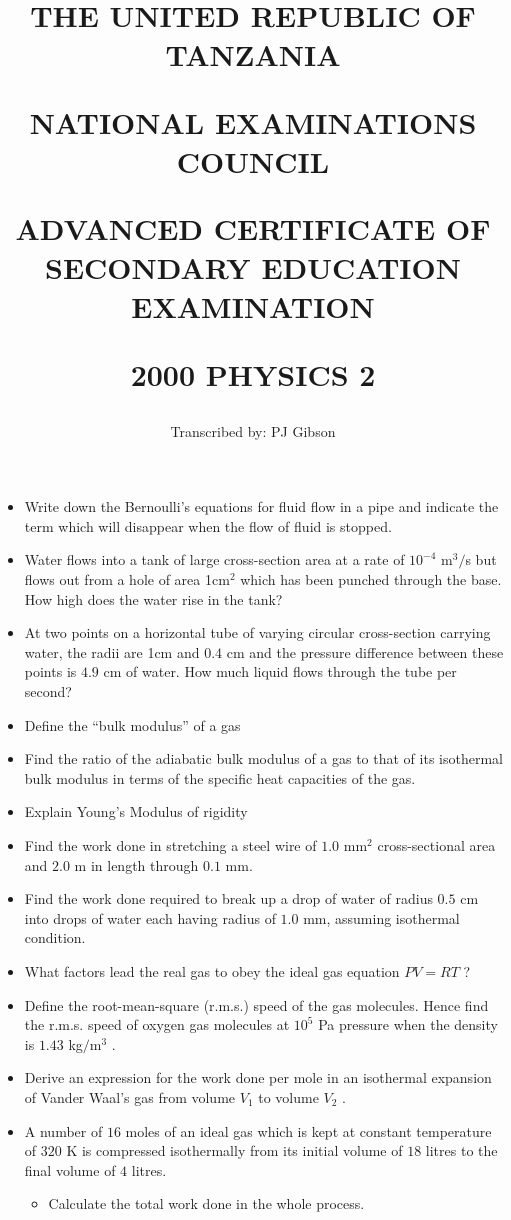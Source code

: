 \documentclass{article}
\title{THE UNITED REPUBLIC OF TANZANIA

NATIONAL EXAMINATIONS COUNCIL

ADVANCED CERTIFICATE OF SECONDARY EDUCATION EXAMINATION

\textbf{2000 PHYSICS 2}}
\author{Transcribed by:  PJ Gibson}
\begin{document}
\maketitle

\begin{itemize}
\item Write down the Bernoulli's equations for fluid flow in a pipe and indicate the term which will disappear when the flow of fluid is stopped.
\item Water flows into a tank of large cross-section area at a rate of $ 10^{-4}$ m$ ^{3}/$s but flows out from a  hole of area 1cm$ ^{2}$ which has been punched through the base. How high does the water rise in the tank?
\item At two points on a horizontal tube of varying circular cross-section carrying water, the radii are 1cm and $ 0.4$ cm and the pressure difference between these points is $ 4.9$ cm of water. How much liquid flows through the tube per second?
\item Define the “bulk modulus” of a gas
\item Find the ratio of the adiabatic bulk modulus of a gas to that of its isothermal bulk modulus in terms of the specific heat capacities of the gas.
\item Explain Young’s Modulus of rigidity
\item Find the work done in stretching a steel wire of $ 1.0$ mm$ ^{2}$ cross-sectional area and $ 2.0$ m in length through $ 0.1$ mm.
\item Find the work done required to break up a drop of water of radius $ 0.5$ cm into drops of water each having radius of $ 1.0$ mm, assuming isothermal condition.
\item What factors lead the real gas to obey the ideal gas equation $ PV = RT$ ?
\item Define the root-mean-square (r.m.s.) speed of the gas molecules. Hence find the r.m.s. speed of oxygen gas molecules at $ 10^{5}$ Pa pressure when the density is $ 1.43$ kg$/$m$ ^{3}$ .
\item Derive an expression for the work done per mole in an isothermal expansion of Vander Waal’s gas from volume $ V_{1}$ to volume $ V_{2}$ .
\item A number of $ 16$ moles of an ideal gas which is kept at constant temperature of $ 320$ K is compressed isothermally from its initial volume of $ 18$ litres to the final volume of $ 4$ litres.
 \begin{itemize}
\item Calculate the total work done in the whole process.

\end{itemize}
\end{itemize}
\end{document}
